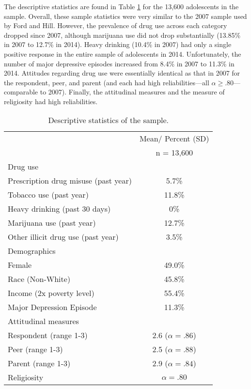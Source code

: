 \documentclass[]{article}
\begin{document}
The descriptive statistics are found in Table \ref{tab:table1} for the
13,600 adolescents in the sample. Overall, these sample statistics were
very similar to the 2007 sample used by Ford and Hill. However, the
prevalence of drug use across each category dropped since 2007, although
marijuana use did not drop substantially (13.85\% in 2007 to 12.7\% in
2014). Heavy drinking (10.4\% in 2007) had only a single positive
response in the entire sample of adolescents in 2014. Unfortunately, the
number of major depressive episodes increased from 8.4\% in 2007 to
11.3\% in 2014. Attitudes regarding drug use were essentially identical
as that in 2007 for the respondent, peer, and parent (and each had high
reliabilities---all \(\alpha \geq .80\)---comparable to 2007). Finally,
the attitudinal measures and the measure of religiosity had high
reliabilities.

\begin{table}[ htb ] 
\centering 
\caption{Descriptive statistics of the sample.}
\begin{tabular}{ lc }
\toprule
  & Mean/ Percent (SD) \\ 
  & n = 13,600 \\ 
\midrule
Drug use & \\
\hspace{6pt} Prescription drug misuse (past year) & 5.7\% \\ 
\hspace{6pt} Tobacco use (past year)              & 11.8\% \\ 
\hspace{6pt} Heavy drinking (past 30 days)        & 0\% \\ 
\hspace{6pt} Marijuana use (past year)            & 12.7\% \\ 
\hspace{6pt} Other illicit drug use (past year)   & 3.5\% \\ 
Demographics & \\
\hspace{6pt} Female                    & 49.0\% \\ 
\hspace{6pt} Race (Non-White)          & 45.8\% \\ 
\hspace{6pt} Income (2x poverty level) & 55.4\% \\ 
Major Depression Episode               & 11.3\% \\ 
Attitudinal measures & \\
\hspace{6pt} Respondent (range 1-3) & 2.6 ($\alpha = .86$) \\ 
\hspace{6pt} Peer (range 1-3)       & 2.5 ($\alpha = .88$) \\ 
\hspace{6pt} Parent (range 1-3)     & 2.9 ($\alpha = .84$) \\ 
Religiosity & $\alpha = .80$ \\ 
\bottomrule
\end{tabular}\label{tab:table1}
\end{table}
\end{document}

